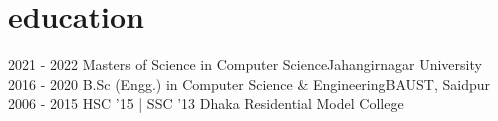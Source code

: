 \section*{education}
\begin{entrylist}
	\entry
	{2021 - 2022}
	{Masters of Science {\normalfont in Computer Science}}{Jahangirnagar University}
	{}
	\entry
	{2016 - 2020}
	{B.Sc (Engg.) {\normalfont in Computer Science \& Engineering}}{BAUST, Saidpur}
	{}
	\entry
	{2006 - 2015}
	{HSC {\normalfont '15} | SSC {\normalfont '13}}
	{Dhaka Residential Model College}
	{}
\end{entrylist}


